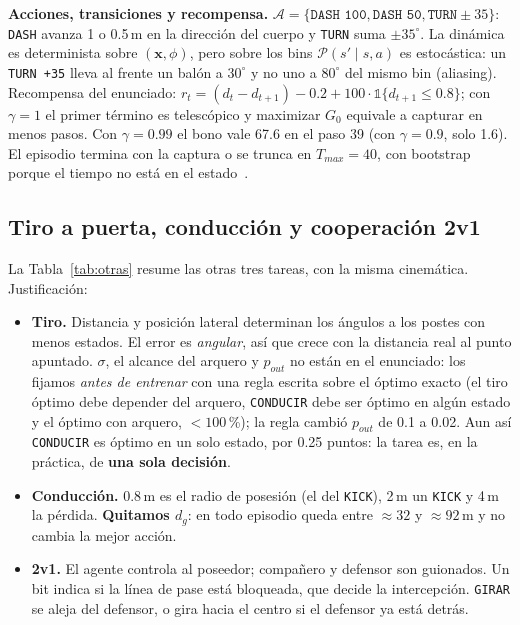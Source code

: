 \documentclass[11pt,a4paper]{article}
\begin{document}
\textbf{Acciones, transiciones y recompensa.} $\mathcal{A} = \{\texttt{DASH 100}, \texttt{DASH 50},
\texttt{TURN} \pm 35\}$: \texttt{DASH} avanza 1 o 0.5\,m en la dirección del cuerpo y \texttt{TURN} suma
$\pm 35^\circ$. La dinámica es determinista sobre $(\mathbf{x}, \phi)$, pero sobre los bins $\mathcal{P}(s' \mid s, a)$
es estocástica: un \texttt{TURN +35} lleva al frente un balón a $30^\circ$ y no uno a $80^\circ$ del mismo bin
(aliasing). Recompensa del enunciado: $r_t = (d_t - d_{t+1}) - 0.2 + 100 \cdot \mathbb{1}\{d_{t+1} \le 0.8\}$; con
$\gamma = 1$ el primer término es telescópico y maximizar $G_0$ equivale a capturar en menos pasos. Con
$\gamma = 0.99$ el bono vale 67.6 en el paso 39 (con $\gamma = 0.9$, solo 1.6). El episodio termina con la captura o
se trunca en $T_{max} = 40$, con bootstrap porque el tiempo no está en el estado~\cite{pardo2018}.

\subsection{Tiro a puerta, conducción y cooperación 2v1}

La Tabla~\ref{tab:otras} resume las otras tres tareas, con la misma cinemática. Justificación:
\begin{itemize}
    \item \textbf{Tiro.} Distancia y posición lateral determinan los ángulos a los postes con menos estados. El
    error es \emph{angular}, así que crece con la distancia real al punto apuntado. $\sigma$, el alcance del arquero
    y $p_{out}$ no están en el enunciado: los fijamos \emph{antes de entrenar} con una regla escrita sobre el óptimo
    exacto (el tiro óptimo debe depender del arquero, \texttt{CONDUCIR} debe ser óptimo en algún estado y el óptimo
    con arquero, $< 100$\,\%); la regla cambió $p_{out}$ de 0.1 a 0.02. Aun así \texttt{CONDUCIR} es óptimo en un
    solo estado, por 0.25 puntos: la tarea es, en la práctica, de \textbf{una sola decisión}.
    \item \textbf{Conducción.} 0.8\,m es el radio de posesión (el del \texttt{KICK}), 2\,m un \texttt{KICK} y 4\,m la
    pérdida. \textbf{Quitamos $d_g$}: en todo episodio queda entre $\approx 32$ y $\approx 92$\,m y no cambia la mejor
    acción.
    \item \textbf{2v1.} El agente controla al poseedor; compañero y defensor son guionados. Un bit indica si la línea
    de pase está bloqueada, que decide la intercepción. \texttt{GIRAR} se aleja del defensor, o gira hacia el centro si
    el defensor ya está detrás.
\end{itemize}
\end{document}
